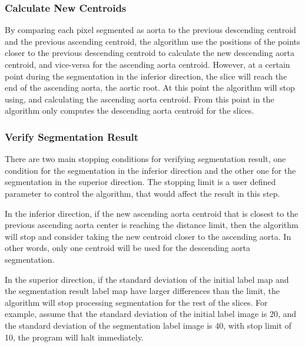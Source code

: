 \subsubsection{Calculate New Centroids}
By comparing each pixel segmented as aorta to the previous descending centroid and the previous ascending centroid, the algorithm use the positions of the points closer to the previous descending centroid to calculate the new descending aorta centroid, and vice-versa for the ascending aorta centroid. However, at a certain point during the segmentation in the inferior direction, the slice will reach the end of the ascending aorta, the aortic root. At this point the algorithm will stop using, and calculating the ascending aorta centroid.  From this point in the algorithm only computes the descending aorta centroid for the slices.

\subsubsection{Verify Segmentation Result}\label{stopping_condition}
There are two main stopping conditions for verifying segmentation result, one condition for the segmentation in the inferior direction and the other one for the segmentation in the superior direction. The stopping limit is a user defined parameter to control the algorithm, that would affect the result in this step.

In the inferior direction, if the new ascending aorta centroid that is closest to the previous ascending aorta center is reaching the distance limit, then the algorithm will stop and consider taking the new centroid closer to the ascending aorta. In other words, only one centroid will be used for the descending aorta segmentation.

In the superior direction, if the standard deviation of the initial label map and the segmentation result label map have larger differences than the limit, the algorithm will stop processing segmentation for the rest of the slices. For example, assume that the standard deviation of the initial label image is 20, and the standard deviation of the segmentation label image is 40, with stop limit of 10, the program will halt immediately.

